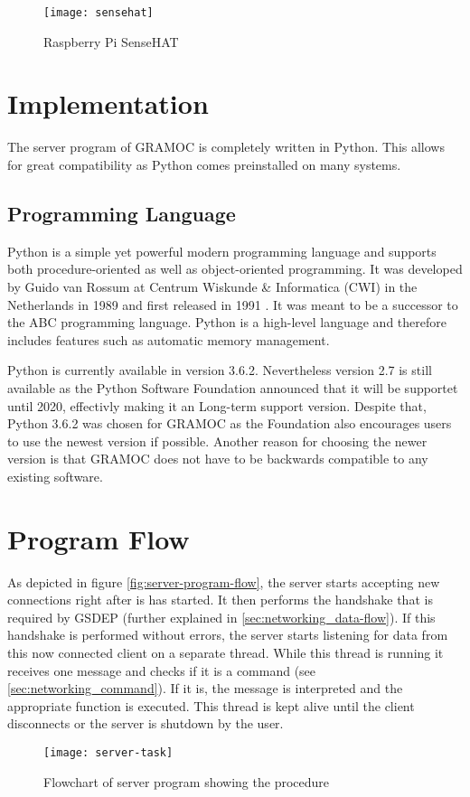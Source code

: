 \begin{figure}[H]
	\centering
	\texttt{[image: sensehat]}
	\caption[Raspberry Pi SenseHAT]{Raspberry Pi SenseHAT \autocite{img:sensehat}}
	\label{fig:sensehat}
\end{figure}

\section{Implementation}

The server program of GRAMOC is completely written in Python. This allows for great compatibility as Python comes preinstalled on many systems.

\subsection{Programming Language}

Python is a simple yet powerful modern programming language and supports both procedure-oriented as well as object-oriented programming. It was developed by Guido van Rossum at Centrum Wiskunde \& Informatica (CWI) in the Netherlands in 1989 and first released in 1991 \autocite{HistoryOfPython}. It was meant to be a successor to the ABC programming language. Python is a high-level language and therefore includes features such as automatic memory management.

Python is currently available in version 3.6.2. Nevertheless version 2.7 is still available as the Python Software Foundation announced that it will be supportet until 2020, effectivly making it an Long-term support version. Despite that, Python 3.6.2 was chosen for GRAMOC as the Foundation also encourages users to use the newest version if possible. Another reason for choosing the newer version is that GRAMOC does not have to be backwards compatible to any existing software.

\section{Program Flow}

As depicted in figure \vref{fig:server-program-flow}, the server starts accepting new connections right after is has started. It then performs the handshake that is required by GSDEP (further explained in \vref{sec:networking_data-flow}). If this handshake is performed without errors, the server starts listening for data from this now connected client on a separate thread. While this thread is running it receives one message and checks if it is a command (see \vref{sec:networking_command}). If it is, the message is interpreted and the appropriate function is executed. This thread is kept alive until the client disconnects or the server is shutdown by the user.

\begin{figure}[H]
	\centering
	\texttt{[image: server-task]}
	\caption{Flowchart of server program showing the procedure}
	\label{fig:server-program-flow}
\end{figure}
